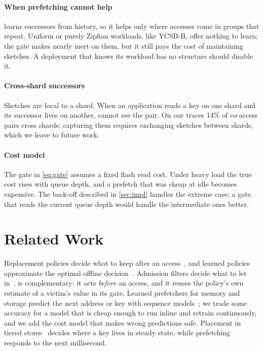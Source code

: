 \documentclass[10pt, twocolumn]{article}
\begin{document}
\paragraph{When prefetching cannot help}
\sys{} learns successors from history, so it helps only where accesses come
in groups that repeat. Uniform or purely Zipfian workloads, like YCSB-B,
offer nothing to learn; the gate makes \sys{} nearly inert on them, but it
still pays the cost of maintaining sketches. A deployment that knows its
workload has no structure should disable it.

\paragraph{Cross-shard successors}
Sketches are local to a shard. When an application reads a key on one shard
and its successor lives on another, \sys{} cannot see the pair. On our
traces 14\% of co-access pairs cross shards; capturing them requires
exchanging sketches between shards, which we leave to future work.

\paragraph{Cost model}
The gate in \eqref{eq:gate} assumes a fixed flash read cost. Under heavy
load the true cost rises with queue depth, and a prefetch that was cheap at
idle becomes expensive. The back-off described in \cref{sec:impl} handles
the extreme case; a gate that reads the current queue depth would handle
the intermediate ones better.

\section{Related Work}

Replacement policies decide what to keep after an
access~\cite{oneil1993lruk,megiddo2003arc}, and learned policies approximate
the optimal offline decision~\cite{song2020lrb}. Admission filters decide
what to let in~\cite{brandao2024ghost}. \sys{} is complementary:
it acts \emph{before} an access, and it reuses the policy's own estimate of
a victim's value in its gate. Learned prefetchers for memory and storage
predict the next address or key with sequence
models~\cite{hashemi2018,osei2023prefetch}; we trade some accuracy for a
model that is cheap enough to run inline and retrain continuously, and we
add the cost model that makes wrong predictions safe. Placement in tiered
stores~\cite{varga2022tiered} decides where a key lives in steady state,
while prefetching responds to the next millisecond.
\end{document}

